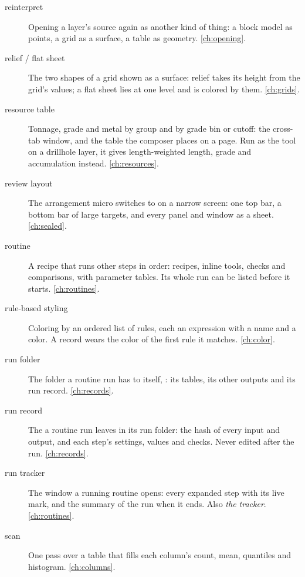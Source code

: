\begin{description}
\item[reinterpret] Opening a layer's source again as another kind of thing: a block model as
  points, a grid as a surface, a table as geometry. \cref{ch:opening}.

\item[relief / flat sheet] The two shapes of a grid shown as a surface: relief takes its height
  from the grid's values; a flat sheet lies at one level and is colored by them. \cref{ch:grids}.

\item[resource table] Tonnage, grade and metal by group and by grade bin or cutoff: the cross-tab
  window, and the table the composer places on a page. Run as the  tool on a drillhole
  layer, it gives length-weighted length, grade and accumulation instead. \cref{ch:resources}.

\item[review layout] The arrangement micro switches to on a narrow screen: one top bar, a bottom bar
  of large targets, and every panel and window as a sheet. \cref{ch:sealed}.

\item[routine] A recipe that runs other steps in order: recipes, inline tools, checks and
  comparisons, with parameter tables. Its whole run can be listed before it starts.
  \cref{ch:routines}.

\item[rule-based styling] Coloring by an ordered list of rules, each an expression with a name and
  a color. A record wears the color of the first rule it matches. \cref{ch:color}.

\item[run folder] The folder a routine run has to itself, :
  its tables, its other outputs and its run record. \cref{ch:records}.

\item[run record] The  a routine run leaves in its run folder: the hash of every
  input and output, and each step's settings, values and checks. Never edited after the run.
  \cref{ch:records}.

\item[run tracker] The window a running routine opens: every expanded step with its live mark, and
  the summary of the run when it ends. Also \emph{the tracker}. \cref{ch:routines}.

\item[scan] One pass over a table that fills each column's count, mean, quantiles and histogram.
  \cref{ch:columns}.


\end{description}

